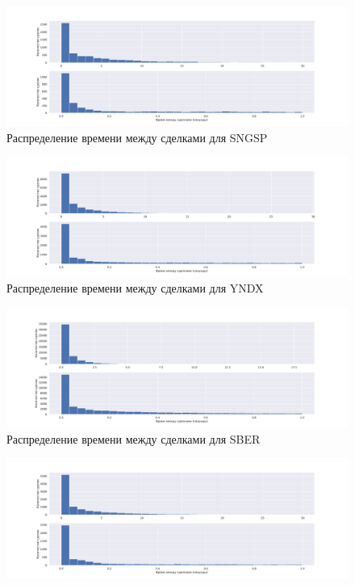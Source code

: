 \begin{appendices}
        \begin{figure}
            \includegraphics[scale=0.35]{fig/timedistr/SE/SNGSP.pdf}
            \caption{Распределение времени между сделками для SNGSP}
            \label{TimeDistrSNGSPWP}
        \end{figure}

        \begin{figure}
                \includegraphics[scale=0.35]{fig/timedistr/SE/YNDX.pdf}
                \caption{Распределение времени между сделками для YNDX}
                \label{appstart}
        \end{figure}
        \begin{figure}
                \includegraphics[scale=0.35]{fig/timedistr/SE/SBER.pdf}
                \caption{Распределение времени между сделками для SBER}
                \label{app}
        \end{figure}
        \begin{figure}
            \includegraphics[scale=0.35]{fig/timedistr/SE/ROSN.pdf}

\end{figure}
\end{appendices}
